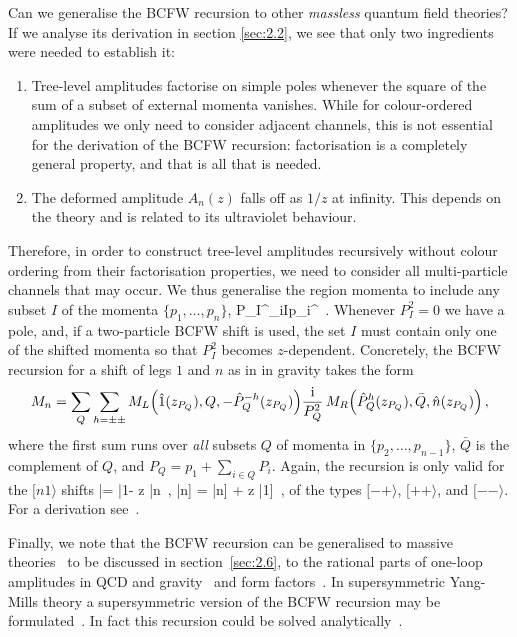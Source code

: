 Can we generalise the BCFW recursion to other \emph{massless} quantum field theories? If we 
analyse its
derivation in section \ref{sec:2.2}, we see that only two ingredients were  needed to establish it:
\begin{enumerate}
\item Tree-level amplitudes factorise on simple poles
whenever the square of the sum of a subset of external momenta vanishes. While for colour-ordered amplitudes we only need to consider adjacent channels, this is not essential for
the derivation of the BCFW recursion: factorisation is a completely general property, and that
is all that is needed.
\smallskip
\item The deformed amplitude $A_{n}(z)$ falls off as $1/z$ at infinity. This depends on the theory and is related to its ultraviolet  behaviour.
\end{enumerate}
Therefore, in order to construct 
tree-level amplitudes recursively without colour ordering from their factorisation properties, we need to
consider all multi-particle channels that may occur. We thus generalise the region momenta to include any subset $I$ of the momenta $\{p_1,\ldots,p_n\}$,
\be
P_{I}^{\mu}\coloneqq\sum_{i\in I}p_{i}^{\mu} \,.
\ee
Whenever  $P_{I}^{2}=0$ we have a pole, and, if a two-particle BCFW shift is used, the set $I$ must contain only one of the shifted momenta so that $P_{I}^{2}$ becomes $z$-dependent.
Concretely, the BCFW recursion
for a shift of legs $1$ and $n$ as in 
in gravity takes the form~\cite{ch2_Bedford:2005yy, ch2_Cachazo:2005ca}
%
\begin{align}\label{eq-bcfw-grav}
M_{n} =  
 \sum_Q \sum_{h=\pm\pm} %
 M_L\Bigl(\hat{1}(z_{P_{Q}}),Q, 
-\hat{P}_{Q}^{-h}(z_{P_{Q}})\Bigr)
\frac{\i}{P_{Q}^2}\,  M_{R}\Bigl (\hat{P}^{h}_{Q}(z_{P_{Q}}),\bar{Q}, \hat{n}(z_{P_{Q}}) \Bigr ) \,,
\end{align}
%
where the first sum runs over \emph{all} subsets $Q$ of momenta in  $\{p_{2},\ldots, p_{n-1}\}$, $\bar{Q}$ is the complement of $Q$, and
$P_{Q}=p_{1}+\sum_{i\in Q}P_{i}$.
Again, the recursion is only valid for the $[n1\rangle$ shifts
%
\be
\label{thisonep}
|\rangle = |1\rangle - z |n\rangle\, , \qquad
|\hat n] = |n] + z |1]\, ,
\ee
%
of the types $[-+\rangle$, $[++\rangle$, and $[--\rangle$. For a derivation
see~\cite{ch2_Arkani-Hamed:2008bsc}.

Finally, we note that the BCFW recursion can be  generalised to massive theories~\cite{ch2_Badger:2005zh,ch2_Badger:2005jv} to be discussed in section~\ref{sec:2.6}, to 
the rational parts of one-loop amplitudes in QCD and gravity~\cite{ch2_Bern:2005hs,ch2_Bern:2005ji,ch2_Brandhuber:2007up,ch2_Dunbar:2010xk,ch2_Alston:2015gea} and form factors~\cite{ch2_Brandhuber:2010ad,ch2_Brandhuber:2011tv}. In supersymmetric Yang-Mills theory a
supersymmetric  version of the BCFW recursion may be formulated~\cite{ch2_Brandhuber:2008pf,ch2_Arkani-Hamed:2008owk}. In fact this recursion could be solved analytically~\cite{ch2_Drummond:2008cr}. 

